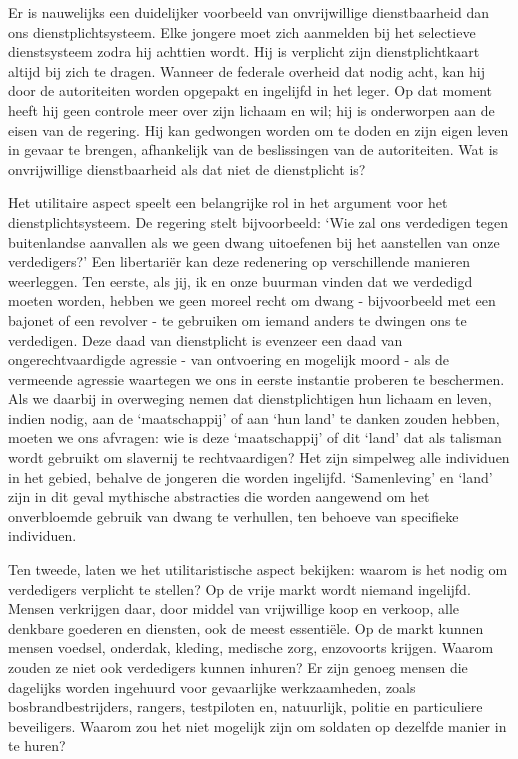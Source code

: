\documentclass[
  a5paper,
  smalldemyvopaper,10pt,twoside,onecolumn,openright,extrafontsizes,hidelinks]{memoir}
\begin{document}
Er is nauwelijks een duidelijker voorbeeld van onvrijwillige
dienstbaarheid dan ons dienstplichtsysteem. Elke jongere moet zich
aanmelden bij het selectieve dienstsysteem zodra hij achttien wordt. Hij
is verplicht zijn dienstplichtkaart altijd bij zich te dragen. Wanneer
de federale overheid dat nodig acht, kan hij door de autoriteiten worden
opgepakt en ingelijfd in het leger. Op dat moment heeft hij geen
controle meer over zijn lichaam en wil; hij is onderworpen aan de eisen
van de regering. Hij kan gedwongen worden om te doden en zijn eigen
leven in gevaar te brengen, afhankelijk van de beslissingen van de
autoriteiten. Wat is onvrijwillige dienstbaarheid als dat niet de
dienstplicht is?

Het utilitaire aspect speelt een belangrijke rol in het argument voor
het dienstplichtsysteem. De regering stelt bijvoorbeeld: `Wie zal ons
verdedigen tegen buitenlandse aanvallen als we geen dwang uitoefenen bij
het aanstellen van onze verdedigers?' Een libertariër kan deze
redenering op verschillende manieren weerleggen. Ten eerste, als jij, ik
en onze buurman vinden dat we verdedigd moeten worden, hebben we geen
moreel recht om dwang - bijvoorbeeld met een bajonet of een revolver -
te gebruiken om iemand anders te dwingen ons te verdedigen. Deze daad
van dienstplicht is evenzeer een daad van ongerechtvaardigde agressie -
van ontvoering en mogelijk moord - als de vermeende agressie waartegen
we ons in eerste instantie proberen te beschermen. Als we daarbij in
overweging nemen dat dienstplichtigen hun lichaam en leven, indien
nodig, aan de `maatschappij' of aan `hun land' te danken zouden hebben,
moeten we ons afvragen: wie is deze `maatschappij' of dit `land' dat als
talisman wordt gebruikt om slavernij te rechtvaardigen? Het zijn
simpelweg alle individuen in het gebied, behalve de jongeren die worden
ingelijfd. `Samenleving' en `land' zijn in dit geval mythische
abstracties die worden aangewend om het onverbloemde gebruik van dwang
te verhullen, ten behoeve van specifieke individuen.

Ten tweede, laten we het utilitaristische aspect bekijken: waarom is het
nodig om verdedigers verplicht te stellen? Op de vrije markt wordt
niemand ingelijfd. Mensen verkrijgen daar, door middel van vrijwillige
koop en verkoop, alle denkbare goederen en diensten, ook de meest
essentiële. Op de markt kunnen mensen voedsel, onderdak, kleding,
medische zorg, enzovoorts krijgen. Waarom zouden ze niet ook verdedigers
kunnen inhuren? Er zijn genoeg mensen die dagelijks worden ingehuurd
voor gevaarlijke werkzaamheden, zoals bosbrandbestrijders, rangers,
testpiloten en, natuurlijk, politie en particuliere beveiligers. Waarom
zou het niet mogelijk zijn om soldaten op dezelfde manier in te huren?
\end{document}
